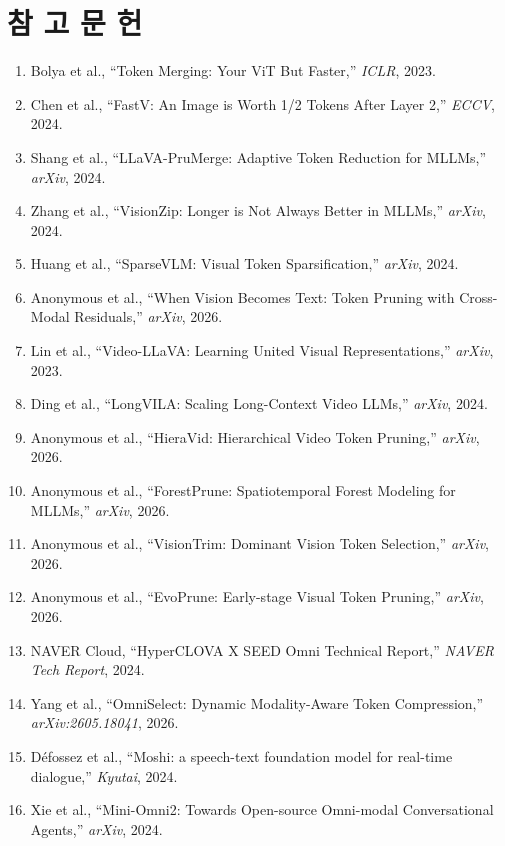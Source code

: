 \documentclass[10pt, a4paper, twocolumn]{article}
\begin{document}
\section*{참 고 문 헌}
\scriptsize
\begin{enumerate}
    \setlength{\itemsep}{0.5pt}
    \setlength{\parskip}{0pt}
    \setlength{\parsep}{0pt}
    \item Bolya et al., ``Token Merging: Your ViT But Faster,'' \textit{ICLR}, 2023.
    \item Chen et al., ``FastV: An Image is Worth 1/2 Tokens After Layer 2,'' \textit{ECCV}, 2024.
    \item Shang et al., ``LLaVA-PruMerge: Adaptive Token Reduction for MLLMs,'' \textit{arXiv}, 2024.
    \item Zhang et al., ``VisionZip: Longer is Not Always Better in MLLMs,'' \textit{arXiv}, 2024.
    \item Huang et al., ``SparseVLM: Visual Token Sparsification,'' \textit{arXiv}, 2024.
    \item Anonymous et al., ``When Vision Becomes Text: Token Pruning with Cross-Modal Residuals,'' \textit{arXiv}, 2026.
    \item Lin et al., ``Video-LLaVA: Learning United Visual Representations,'' \textit{arXiv}, 2023.
    \item Ding et al., ``LongVILA: Scaling Long-Context Video LLMs,'' \textit{arXiv}, 2024.
    \item Anonymous et al., ``HieraVid: Hierarchical Video Token Pruning,'' \textit{arXiv}, 2026.
    \item Anonymous et al., ``ForestPrune: Spatiotemporal Forest Modeling for MLLMs,'' \textit{arXiv}, 2026.
    \item Anonymous et al., ``VisionTrim: Dominant Vision Token Selection,'' \textit{arXiv}, 2026.
    \item Anonymous et al., ``EvoPrune: Early-stage Visual Token Pruning,'' \textit{arXiv}, 2026.
    \item NAVER Cloud, ``HyperCLOVA X SEED Omni Technical Report,'' \textit{NAVER Tech Report}, 2024.
    \item Yang et al., ``OmniSelect: Dynamic Modality-Aware Token Compression,'' \textit{arXiv:2605.18041}, 2026.
    \item Défossez et al., ``Moshi: a speech-text foundation model for real-time dialogue,'' \textit{Kyutai}, 2024.
    \item Xie et al., ``Mini-Omni2: Towards Open-source Omni-modal Conversational Agents,'' \textit{arXiv}, 2024.

\end{enumerate}
\end{document}
